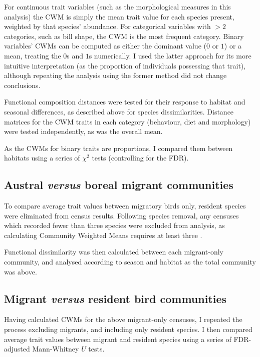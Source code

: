 \documentclass[12pt,a4paper]{book}
\begin{document}
For continuous trait variables (such as the morphological measures in this analysis) the CWM is simply the mean trait value for each species present, weighted by that species' abundance. For categorical variables with $>2$ categories, such as bill shape, the CWM is the most frequent category. Binary variables' CWMs can be computed as either the dominant value ($0$ or $1$) or a mean, treating the $0$s and $1$s numerically. I used the latter approach for its more intuitive interpretation (as the proportion of individuals possessing that trait), although repeating the analysis using the former method did not change conclusions.

Functional composition distances were tested for their response to habitat and seasonal differences, as described above for species dissimilarities. Distance matrices for the CWM traits in each category (behaviour, diet and morphology) were tested independently, as was the overall mean.

As the CWMs for binary traits are proportions, I compared them between habitats using a series of $\chi^2$ tests (controlling for the FDR). 

\subsection{Austral \emph{versus} boreal migrant communities}

To compare average trait values between migratory birds only, resident species were eliminated from census results. Following species removal, any censuses which recorded fewer than three species were excluded from analysis, as calculating Community Weighted Means requires at least three \citep{Lavorel2008}.

Functional dissimilarity was then calculated between each migrant-only community, and analysed according to season and habitat as the total community was above.

\subsection{Migrant \emph{versus} resident bird communities}

Having calculated CWMs for the above migrant-only censuses, I repeated the process excluding migrants, and including only resident species. I then compared average trait values between migrant and resident species using a series of FDR-adjusted Mann-Whitney $U$ tests. 
\end{document}
